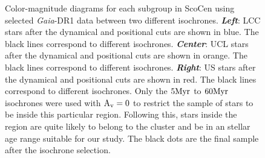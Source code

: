 \begin{figure}[!ht]
\centering
\caption{\scriptsize{Color-magnitude diagrams for each subgroup in ScoCen using selected \textit{Gaia}-DR1 data between two different isochrones. \textit{\textbf{Left}}: LCC stars after the dynamical and positional cuts are shown in blue. The black lines correspond to different isochrones. \textit{\textbf{Center}}: UCL stars after the dynamical and positional cuts are shown in orange. The black lines correspond to different isochrones. \textit{\textbf{Right}}: US stars after the dynamical and positional cuts are shown in red. The black lines correspond to different isochrones. Only the $5 \textnormal{Myr}$ to $60 \textnormal{Myr}$ isochrones were used with $\textnormal{A}_\textnormal{v} = 0$ to restrict the sample of stars to be inside this particular region. Following this, stars inside the region are quite likely to belong to the cluster and be in an stellar age range suitable for our study. The black dots are the final sample after the isochrone selection.}}
\label{fig:Isochrones_2}
\end{figure}

